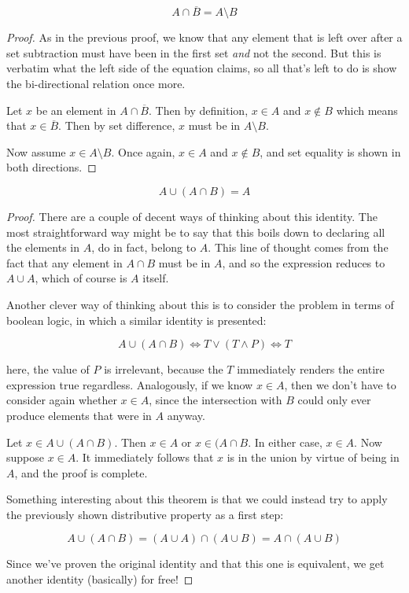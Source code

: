 \documentclass{standalone}
\begin{document}
\begin{theorem}
  \[
    A \cap \overline{B} = A \setminus B
  \]
\end{theorem}

\begin{proof}
  As in the previous proof, we know that any element that is left over after a
  set subtraction must have been in the first set \emph{and} not the second.
  But this is verbatim what the left side of the equation claims, so all that's
  left to do is show the bi-directional relation once more.

  Let $x$ be an element in $A \cap \overline{B}$. Then by definition, $x \in A$ and
  $x \not \in B$ which means that $x \in \overline{B}$. Then by set difference, $x$
  must be in $A \setminus B$.

  Now assume $x \in A \setminus B$. Once again, $x \in A$ and $x \not \in B$,
  and set equality is shown in both directions.
\end{proof}

\begin{theorem}
  \[
    A \cup (A \cap B) = A
  \]
\end{theorem}

\begin{proof}
  There are a couple of decent ways of thinking about this identity. The most
  straightforward way might be to say that this boils down to declaring all the
  elements in $A$, do in fact, belong to $A$. This line of thought comes from
  the fact that any element in $A \cap B$ must be in $A$, and so the expression
  reduces to $A \cup A$, which of course is $A$ itself.

  Another clever way of thinking about this is to consider the problem in terms
  of boolean logic, in which a similar identity is presented:

  \[
    A \cup (A \cap B) \iff T \lor (T \land P) \iff T
  \]

  here, the value of $P$ is irrelevant, because the $T$ immediately renders the
  entire expression true regardless. Analogously, if we know $x \in A$, then we
  don't have to consider again whether $x \in A$, since the intersection with
  $B$ could only ever produce elements that were in $A$ anyway.

  Let $x \in A \cup (A \cap B)$. Then $x \in A$ or $x \in (A \cap B$. In either
  case, $x \in A$. Now suppose $x \in A$. It immediately follows that $x$ is in
  the union by virtue of being in $A$, and the proof is complete.

  Something interesting about this theorem is that we could instead try to apply
  the previously shown distributive property as a first step:

  \[
    A \cup (A \cap B) = (A \cup A) \cap (A \cup B) = A \cap (A \cup B)
  \]

  Since we've proven the original identity and that this one is equivalent, we
  get another identity (basically) for free!
\end{proof}
\end{document}
